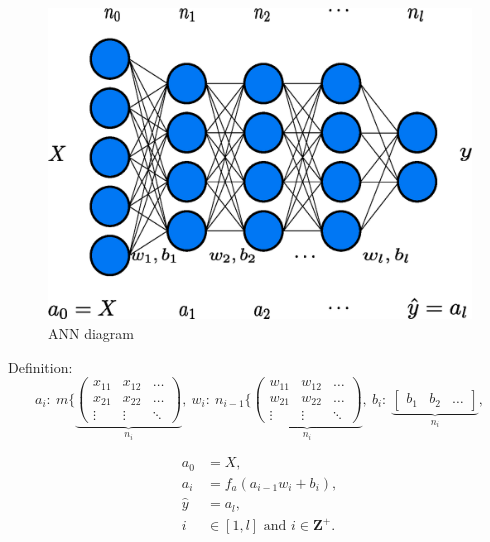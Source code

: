 \documentclass[a4paper,12pt]{article}
\begin{document}
\flushleft{\Ai}

\begin{figure}[ht]
    \centering
    \includegraphics[width = \textwidth]{ann_diagram}
    \caption{ANN diagram}
    \label{fig:ann_diagram}
\end{figure}

\raggedright

Definition:
\begin{displaymath}
    a_i: \ m \Bigg\{
    \underbrace{
    \left( \begin{array}{ccc}
    x_{11} & x_{12} & \ldots \\
    x_{21} & x_{22} & \ldots \\
    \vdots & \vdots & \ddots
    \end{array} \right)
    }_{n_i},
\ 
    w_i: \ n_{i-1} \Bigg\{
    \underbrace{
    \left( \begin{array}{ccc}
    w_{11} & w_{12} & \ldots \\
    w_{21} & w_{22} & \ldots \\
    \vdots & \vdots & \ddots
    \end{array} \right)
    }_{n_i},
\ 
    b_i: \ \underbrace{
    \left[ \begin{array}{ccc} b_1 & b_2 & \ldots \end{array} \right]
    }_{n_i},
\end{displaymath}

\begin{align*}
        a_0 &= X, \\
        a_i &= f_a(a_{i-1}w_i + b_i), \\
    \hat{y} &= a_l, \\
          i &\in [1,l] \textrm{ and } i \in \mathbf{Z^+} .
\end{align*}
\end{document}
